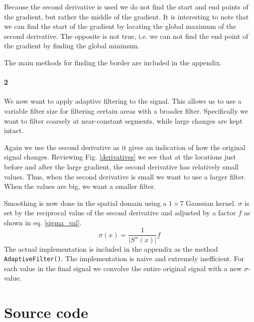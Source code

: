 \documentclass[a4paper, 10pt, final]{article}
\begin{document}
Because the second derivative is used we do not find the start and end
points of the gradient, but rather the middle of the gradient. It is
interesting to note that we can find the start of the gradient by
locating the global maximum of the second derivative. The opposite is
not true, i.e. we can not find the end point of the gradient by finding
the global minimum.

The main methods for finding the border are included in the appendix.

\paragraph{2}
We now want to apply adaptive filtering to the signal. This allows us to
use a variable filter size for filtering certain areas with a broader
filter. Specifically we want to filter coarsely at near-constant
segments, while large changes are kept intact.

Again we use the second derivative as it gives an indication of how the
original signal changes. Reviewing Fig. \ref{derivatives} we see that at
the locations just before and after the large gradient, the second
derivative has relatively small values. Thus, when the second derivative
is small we want to use a larger filter. When the values are big, we
want a smaller filter.

Smoothing is now done in the spatial domain using a $1 \times 7$
Gaussian kernel. $\sigma$ is set by the reciprocal value of the second
derivative and adjusted by a factor $f$ as shown in eq. \eqref{sigma_val}.
\begin{equation}
    \sigma(x) = \frac{1}{|S''(x)|}f
    \label{sigma_val}
\end{equation}
The actual implementation is included in the appendix as the method
\texttt{AdaptiveFilter()}. The implementation is naive and extremely
inefficient. For each value in the final signal we convolve the entire
original signal with a new $\sigma$-value.





\appendix
\lstset{language=Matlab, basicstyle=\scriptsize,
    showstringspaces=false, numbers=left, stepnumber=1,
    numberstyle=\tiny, frame=none}
\section{Source code}
\end{document}
